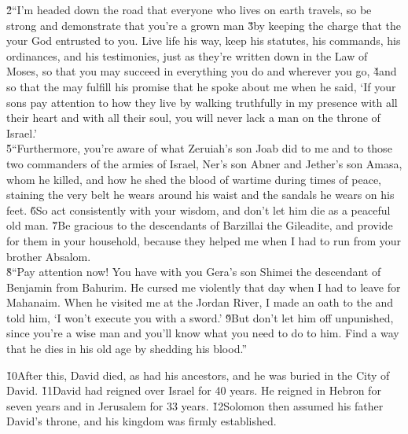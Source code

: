 \begin{poetry}
\poeml \v{2}``I'm headed down the road that everyone who lives on earth travels, so be strong and demonstrate that you're a grown man \v{3}by keeping the charge that the  your God entrusted to you. Live life his way, keep his statutes, his commands, his ordinances, and his testimonies, just as they're written down in the Law of Moses, so that you may succeed in everything you do and wherever you go, \v{4}and so that the  may fulfill his promise that he spoke about me when he said, `If your sons pay attention to how they live by walking truthfully in my presence with all their heart and with all their soul, you will never lack a man on the throne of Israel.' \\
\poeml \v{5}``Furthermore, you're aware of what Zeruiah's son Joab did to me and to those two commanders of the armies of Israel, Ner's son Abner and Jether's son Amasa, whom he killed, and how he shed the blood of wartime during times of peace, staining the very belt he wears around his waist and the sandals he wears on his feet. \v{6}So act consistently with your wisdom, and don't let him die as a peaceful old man. \v{7}Be gracious to the descendants of Barzillai the Gileadite, and provide for them in your household, because they helped me when I had to run from your brother Absalom. \\
\poeml \v{8}``Pay attention now! You have with you Gera's son Shimei the descendant of Benjamin from Bahurim. He cursed me violently that day when I had to leave for Mahanaim. When he visited me at the Jordan River, I made an oath to the  and told him, `I won't execute you with a sword.' \v{9}But don't let him off unpunished, since you're a wise man and you'll know what you need to do to him. Find a way that he dies in his old age by shedding his blood.''
\end{poetry}

\v{10}After this, David died, as had his ancestors, and he was buried in the City of David. \v{11}David had reigned over Israel for 40 years. He reigned in Hebron for seven years and in Jerusalem for 33 years. \v{12}Solomon then assumed his father David's throne, and his kingdom was firmly established.

